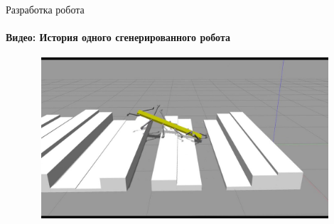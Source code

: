 \documentclass[aspectratio=169,xcolor=table]{beamer}
\begin{document}
\begin{frame}[t]{Разработка робота}
    \framesubtitle{Видео: История одного сгенерированного робота}
    \vspace{-0.6cm}
    \begin{figure}[H]
        \href{https://youtu.be/DcovvkTZgsg}{
            \centering\includegraphics[height=6cm,width=1\textwidth,keepaspectratio]{genetic_video_preview.jpg}}
    \end{figure}
\end{frame}
\end{document}
